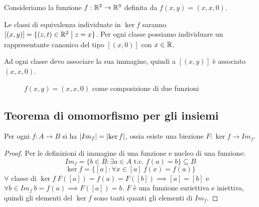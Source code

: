 \begin{exmp}
Consideriamo la funzione $f : \mathbb{R}^2 \to \mathbb{R}^3$ definita da $f(x,y) = (x,x,0)$.

Le classi di equivalenza individuate in $\ker f$ saranno $[(x,y)] = \{ (z,t) \in \mathbb{R}^2 \bigm| z = x\}$. Per ogni classe possiamo individuare un rappresentante canonico del tipo $[(x,0)]$ con $x \in \mathbb{R}$.

Ad ogni classe devo associare la sua immagine, quindi a $[(x,y)]$ \`e associato $(x,x,0)$.

\begin{figure}[ht]
\centering
{}
\caption{$f(x,y) = (x,x,0)$ come composizione di due funzioni}
\end{figure}
\end{exmp}

\subsection{Teorema di omomorfismo per gli insiemi}
\begin{prop}
Per ogni $f : A \to B$ si ha $\left\lvert{Im_f}\right\rvert = \left\lvert{\ker f}\right\rvert$, ossia esiste una biezione $F : \ker f \to Im_f$.
\end{prop}
\begin{proof}
Per le definizioni di immagine di una funzione e nucleo di una funzione:
\[
Im_f = \{ b \in B : \exists a \in A \text{ t.c. } f(a) = b \}\subseteq B
\]
\[
\ker f = \{ [a] : \forall x \in [a] \ f(x) = f(a) \}
\]
$ \forall $ classe di $ \ker f \ F([a]) = f(a) = F([b]) \implies [a] = [b]$ e $\forall b \in Im_f \ b = f(a) \implies F([a]) = b$. $F$ \`e una funzione suriettiva e iniettiva, quindi gli elementi del $\ker f$ sono tanti quanti gli elementi di $Im_f$.
\end{proof}

